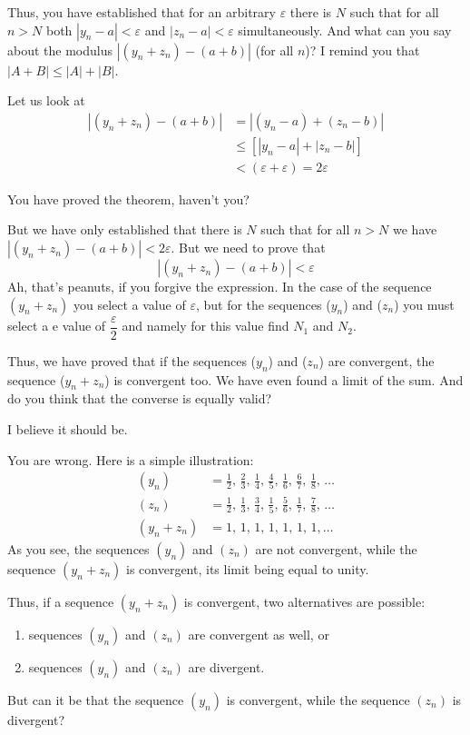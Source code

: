 {\athr Thus, you have established that for an arbitrary $\varepsilon$ there is $N$ such that for all $n > N$ both $| y_{n}- a | < \varepsilon$ and $| z_{n}- a | < \varepsilon$ simultaneously. And what can you say about the modulus $| (y_{n} + z_{n}) - (a +b) |$ (for all $n$)? I remind you that $|A + B | \leqslant |A| + |B|$.

\rdr Let us look at
\begin{align*}%
| (y_{n} + z_{n}) - (a +b) | & = |(y_{n}- a )+(z_{n}- b ) | \\
 & \leqslant [ |y_{n}- a| + |z_{n}- b|] \\
 & < (\varepsilon + \varepsilon ) = 2 \varepsilon 
\end{align*}

\athr You have proved the theorem, haven't you?

\rdr But we have only established that there is $N$ such that for all $n>N$ we have $|(y_{n} + z_{n})- (a+b)|< 2\varepsilon$. But we need to prove that
\begin{equation*}%
|(y_{n}+z_{n}) - (a+b) | < \varepsilon 
\end{equation*}
\athr Ah, that's peanuts, if you forgive the expression. In the case of the sequence $(y_{n} + z_{n})$ you select a value of $\varepsilon$, but for the sequences ($y_{n}$) and ($z_{n}$) you must select a e value of $\dfrac{\varepsilon}{2}$ and namely for this value find $N_{1}$ and $N_{2}$.

Thus, we have proved that if the sequences ($y_{n}$) and ($z_{n}$) are convergent, the sequence ($y_{n} + z_{n}$) is convergent too. We have even found a limit of the sum. And do you think that the converse is equally valid?

\rdr I believe it should be. 

\athr You are wrong. Here is a simple illustration:
\begin{align*}
(y_{n}) & =\frac{1}{2}, \,\frac{2}{3}, \,\frac{1}{4}, \,\frac{4}{5}, \,\frac{1}{6}, \,\frac{6}{7}, \,\frac{1}{8}, \, \ldots \\
(z_{n}) & =\frac{1}{2}, \,\frac{1}{3}, \,\frac{3}{4}, \,\frac{1}{5}, \,\frac{5}{6}, \,\frac{1}{7}, \,\frac{7}{8}, \, \ldots \\
(y_{n} + z_{n}) &= 1, \, 1,  \, 1, \, 1, \, 1, \, 1, \, 1, \ldots 
\end{align*}
As you see, the sequences $(y_{n})$ and $(z_{n})$ are not convergent, while the sequence $(y_{n}+ z_{n})$ is convergent, its limit being equal to unity.

Thus, if a sequence $(y_{n}+ z_{n})$ is convergent, two alternatives are possible:
\begin{enumerate}[label=$\textcolor{IndianRed}{\blacktriangleright}$]
\item sequences $(y_{n})$ and $(z_{n})$ are convergent as well, or 
\item sequences $(y_{n})$ and $(z_{n})$ are divergent. 
\end{enumerate}
\rdr But can it be that the sequence  $(y_{n})$ is convergent, while the sequence  $(z_{n})$ is divergent? 

}
